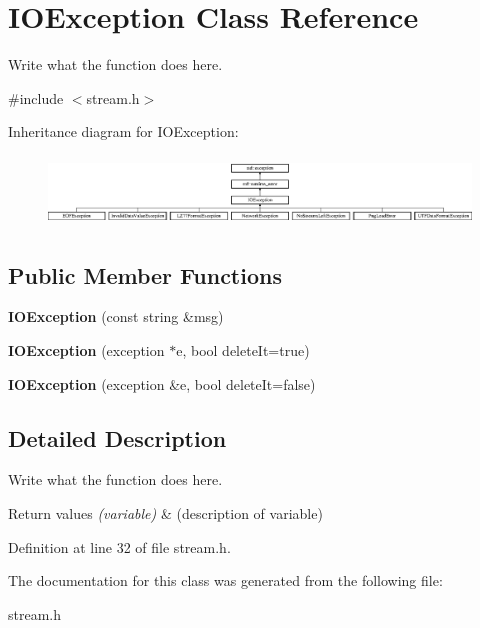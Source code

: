 \hypertarget{classIOException}{\section{I\+O\+Exception Class Reference}
\label{classIOException}
}


Write what the function does here.  




{\ttfamily \#include $<$stream.\+h$>$}

Inheritance diagram for I\+O\+Exception\+:\begin{figure}[H]
\begin{center}
\leavevmode
\includegraphics[height=1.871345cm]{classIOException}
\end{center}
\end{figure}
\subsection*{Public Member Functions}
\begin{DoxyCompactItemize}
\item 
\hypertarget{classIOException_a73fcf78b1b5820aa158680e896f0b983}{{\bfseries I\+O\+Exception} (const string \&msg)}\label{classIOException_a73fcf78b1b5820aa158680e896f0b983}

\item 
\hypertarget{classIOException_a286c271ca82812d1e7c12925acf33d14}{{\bfseries I\+O\+Exception} (exception $\ast$e, bool delete\+It=true)}\label{classIOException_a286c271ca82812d1e7c12925acf33d14}

\item 
\hypertarget{classIOException_abf6ec1a6297e0558758ef144e9e36471}{{\bfseries I\+O\+Exception} (exception \&e, bool delete\+It=false)}\label{classIOException_abf6ec1a6297e0558758ef144e9e36471}

\end{DoxyCompactItemize}


\subsection{Detailed Description}
Write what the function does here. 


\begin{DoxyRetVals}{Return values}
{\em (variable)} & (description of variable) \\
\hline
\end{DoxyRetVals}


Definition at line 32 of file stream.\+h.



The documentation for this class was generated from the following file\+:\begin{DoxyCompactItemize}
\item 
stream.\+h\end{DoxyCompactItemize}
